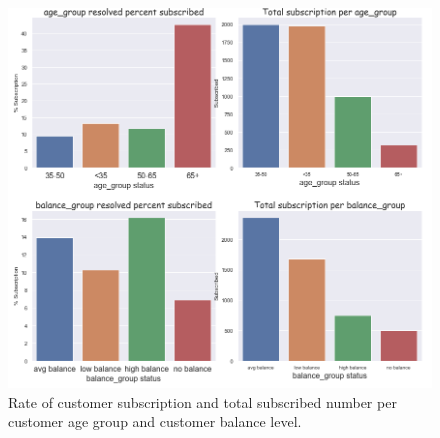 \begin{figure}[tb]
\centering
\includegraphics[width = 1.0\hsize]{./resources/img/fig_age_balance_rate.png}
\caption{Rate of customer subscription and total subscribed number per customer age group and customer balance level.} 
\label{fig:age_balance_rate}
\end{figure}



